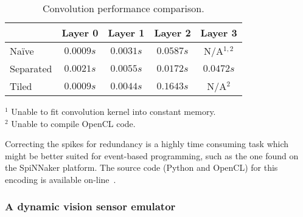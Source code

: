 \begin{table}[hbt]
  \begin{center}
    \caption{Convolution performance comparison.}
    \bgroup
    \def\arraystretch{1.4}
    \begin{tabular}{l c c c c}
      &
      \begin{minipage}{2cm}\centering Layer 0\vspace*{0.1cm}\end{minipage} & 
      \begin{minipage}{2cm}\centering
        Layer 1\vspace*{0.1cm}\end{minipage}& 
      \begin{minipage}{2cm}\centering
        Layer 2\vspace*{0.1cm}\end{minipage}& 
      \begin{minipage}{2cm}\centering
        Layer 3\vspace*{0.1cm}\end{minipage}\\
      \hline 
      
      Naïve     & $0.0009 s$ & $0.0031 s$ & $0.0587 s$ & N/A$^{1,2}$ \\ 
      Separated & $0.0021 s$ & $0.0055 s$ & $0.0172 s$ & $0.0472 s$ \\ 
      Tiled     & $0.0009 s$ & $0.0044 s$ & $0.1643 s$ & N/A$^2$\\
    \end{tabular} 
    \egroup
    {
      \footnotesize 
      \begin{center}
        $^1$ Unable to fit convolution kernel into constant memory.\\
        $^2$ Unable to compile OpenCL code.
      \end{center}
    }
  \end{center}
  \vspace*{-5pt}
\end{table}

Correcting the spikes for redundancy is a highly time consuming task which
might be better suited for event-based programming, such as the one found on 
the SpiNNaker platform. The source code (Python and OpenCL) for this encoding is available on-line~\cite{focal-code}.


\subsubsection{A dynamic vision sensor emulator}

